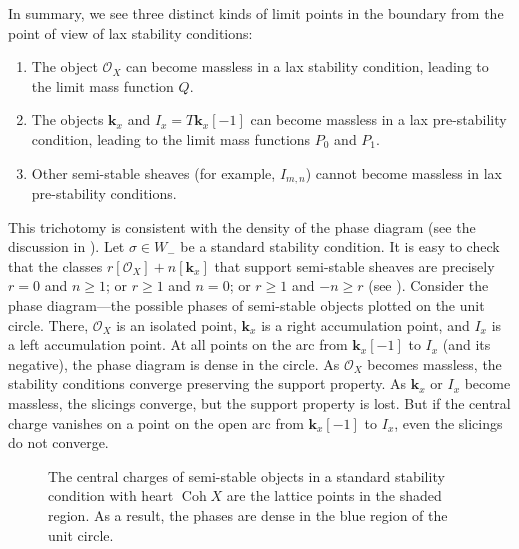 \documentclass{amsart}
\begin{document}
In summary, we see three distinct kinds of limit points in the boundary from the point of view of lax stability conditions:
\begin{enumerate}
\item The object \(\mathcal{O}_X\) can become massless in a lax stability condition, leading to the limit mass function \(Q\).
\item The objects \(\mathbf{k}_x\) and \(I_x = T \mathbf{k}_x[-1]\) can become massless in a lax pre-stability condition, leading to the limit mass functions \(P_0\) and \(P_{1}\).
 \item Other semi-stable sheaves (for example, \(I_{m,n}\)) cannot become massless in lax pre-stability conditions.
\end{enumerate}

This trichotomy is consistent with the density of the phase diagram (see the discussion in \cite[\S~12]{bro.pau.plo.ea:22}).
Let \(\sigma \in W_-\) be a standard stability condition.
It is easy to check that the classes \(r [\mathcal{O}_X] + n [\mathbf{k}_x]\) that support semi-stable sheaves are precisely
\(r = 0\) and \(n \geq 1\); or \(r \geq 1\) and \(n = 0\); or \(r \geq 1\) and \(-n \geq r\) (see ).
Consider the phase diagram---the possible phases of semi-stable objects plotted on the unit circle.
There, \(\mathcal{O}_X\) is an isolated point, \(\mathbf{k}_x\) is a right accumulation point, and \(I_x\) is a left accumulation point.
At all points on the arc from \(\mathbf{k}_x[-1]\) to \(I_x\) (and its negative), the phase diagram is dense in the circle.
As \(\mathcal{O}_X\) becomes massless, the stability conditions converge preserving the support property.
As \(\mathbf{k}_x\) or \(I_x\) become massless, the slicings converge, but the support property is lost.
But if the central charge vanishes on a point on the open arc from \(\mathbf{k}_x[-1]\) to \(I_x\), even the slicings do not converge.
\begin{figure}
  \centering
\caption{The central charges of semi-stable objects in a standard stability condition with heart \(\operatorname{Coh}X\) are the lattice points in the shaded region.  As a result, the phases are dense in the blue region of the unit circle.}
\label{fig:semistables}
\end{figure}
\end{document}
